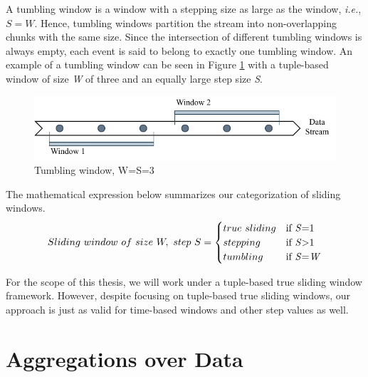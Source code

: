 A tumbling window is a window with a stepping size as large as the window, \textit{i.e.}, $S = W$. Hence, tumbling windows partition the stream into non-overlapping chunks with the same size. Since the intersection of different tumbling windows is always empty, each event is said to belong to exactly one tumbling window. An example of a tumbling window can be seen in Figure \ref{fig:tumbling-window} with a tuple-based window of size \textit{W} of three and an equally large step size \textit{S}.

\begin{figure}[!htb]
    \begin{center}
      \includegraphics[scale=1.1]{figures/tumbling.pdf}
      \caption[Tumbling window]{Tumbling window, W=S=3}
      \label{fig:tumbling-window}
    \end{center}
\end{figure}

The mathematical expression below summarizes our categorization of sliding windows.
\begin{equation} 
\label{math:windows}
  Sliding\ window \,\, of \,\, size \,\, W, \,\, step \,\, S =
    \begin{cases}
      true \,\, sliding & \text{if \textit{S}=1}\\
      stepping & \text{if \textit{S}>1}\\
      tumbling & \text{if \textit{S}=\textit{W}}
    \end{cases}
\end{equation}

For the scope of this thesis, we will work under a tuple-based true sliding window framework. However, despite focusing on tuple-based true sliding windows, our approach is just as valid for time-based windows and other step values as well.

\section{Aggregations over Data} \label{sec:aggregations}

